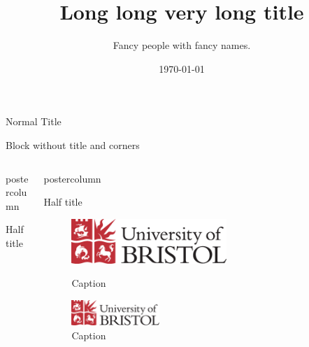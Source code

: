 \documentclass{beamer}
\title{Long long very long title}
\author{Fancy people with fancy names.}
\institute{Fancy institutions with fancy names.}
\date{\today}
\begin{document}
\begin{frame}
	
\vspace{0.8ex}
	
\begin{NRCGblock}{Normal Title}
\blindmathtrue \blindtext
\end{NRCGblock}

\vspace{0.8ex}
\begin{NRCGblock}[colframe=white,no shadow]{}
	Block without title and corners
\end{NRCGblock}	
\vspace{1.0ex}

\begin{columns}[t]
	\begin{column}{.47\textwidth}
		\begin{beamercolorbox}[center,wd=\textwidth]{postercolumn}
			\begin{NRCGblock}[equal height group=A]{Half title}
				\blindtext
			\end{NRCGblock}\vfill
	\end{beamercolorbox}
	\end{column}
	\hspace{0.05em}
	\begin{column}{.47\textwidth}
		\begin{beamercolorbox}[center,wd=\textwidth]{postercolumn}
			\begin{NRCGblock}[equal height group=A]{Half title}
				\blindtext
				\begin{figure}
					\begin{minipage}{0.43\textwidth}
						\centering\includegraphics[width=0.6\textwidth]{uob}
						\caption{Caption}
					\end{minipage}
					\begin{minipage}{0.03\textwidth}
					\end{minipage}
					\begin{minipage}{0.45\textwidth}
						\centering\includegraphics[width=0.34\textwidth]{uob}
						\caption{Caption}
					\end{minipage}
				\end{figure}
			\end{NRCGblock}
		\end{beamercolorbox}
	\end{column}
\end{columns}


\end{frame}
\end{document}
